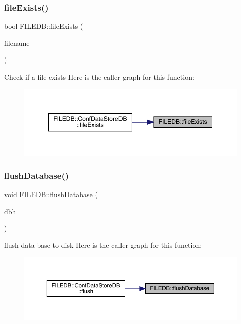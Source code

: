 \subsubsection{\texorpdfstring{fileExists()}{fileExists()}}
{\footnotesize\ttfamily bool F\+I\+L\+E\+D\+B\+::file\+Exists (\begin{DoxyParamCaption}\item[{const std\+::string \&}]{filename }\end{DoxyParamCaption})}

Check if a file exists Here is the caller graph for this function\+:
\nopagebreak
\begin{figure}[H]
\begin{center}
\leavevmode
\includegraphics[width=349pt]{d2/de6/namespaceFILEDB_ae588550e41a7b104b78a0e81ceb24a46_icgraph}
\end{center}
\end{figure}
\mbox{\label{namespaceFILEDB_a28e01191edebd63edee882e8c7af9325}} 
\subsubsection{\texorpdfstring{flushDatabase()}{flushDatabase()}}
{\footnotesize\ttfamily void F\+I\+L\+E\+D\+B\+::flush\+Database (\begin{DoxyParamCaption}\item[{\mbox{\hyperlink{adat-devel_2other__libs_2filedb_2filehash_2ffdb__db_8h_a0b27b956926453a7a8141ea8e10f0df8}{F\+F\+D\+B\+\_\+\+DB}} $\ast$}]{dbh }\end{DoxyParamCaption})}

flush data base to disk Here is the caller graph for this function\+:
\nopagebreak
\begin{figure}[H]
\begin{center}
\leavevmode
\includegraphics[width=350pt]{d2/de6/namespaceFILEDB_a28e01191edebd63edee882e8c7af9325_icgraph}
\end{center}
\end{figure}
\mbox{\label{namespaceFILEDB_ab7ad322a4b472713751d23b4b6495ddf}} 
